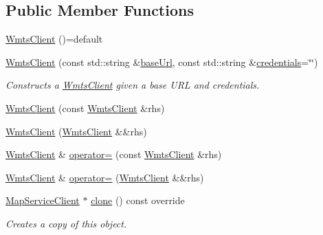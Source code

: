\subsection*{Public Member Functions}
\begin{DoxyCompactItemize}
\item 
\hyperlink{classdg_1_1deepcore_1_1imagery_1_1_wmts_client_a408ab2e9f51053db6d0fbf1074567851}{Wmts\+Client} ()=default
\item 
\hyperlink{classdg_1_1deepcore_1_1imagery_1_1_wmts_client_a7795f68322e43cc9485d541f70caea1c}{Wmts\+Client} (const std\+::string \&\hyperlink{group___imagery_module_gadf279770cec6dc9ac56348bb2e1b29e1}{base\+Url}, const std\+::string \&\hyperlink{group___imagery_module_gac4c03ea635c336ca2fe7de533706c11c}{credentials}=\char`\"{}\char`\"{})
\begin{DoxyCompactList}\small\item\em Constructs a \hyperlink{classdg_1_1deepcore_1_1imagery_1_1_wmts_client}{Wmts\+Client} given a base U\+RL and credentials. \end{DoxyCompactList}\item 
\hyperlink{classdg_1_1deepcore_1_1imagery_1_1_wmts_client_a364b883e40e217fb5f4653d53de21e59}{Wmts\+Client} (const \hyperlink{classdg_1_1deepcore_1_1imagery_1_1_wmts_client}{Wmts\+Client} \&rhs)
\item 
\hyperlink{classdg_1_1deepcore_1_1imagery_1_1_wmts_client_ab4f05e3d9d3bce118d5f74d0570215dc}{Wmts\+Client} (\hyperlink{classdg_1_1deepcore_1_1imagery_1_1_wmts_client}{Wmts\+Client} \&\&rhs)
\item 
\hyperlink{classdg_1_1deepcore_1_1imagery_1_1_wmts_client}{Wmts\+Client} \& \hyperlink{classdg_1_1deepcore_1_1imagery_1_1_wmts_client_a9306a2e8c09ab015a1336a0177e81025}{operator=} (const \hyperlink{classdg_1_1deepcore_1_1imagery_1_1_wmts_client}{Wmts\+Client} \&rhs)
\item 
\hyperlink{classdg_1_1deepcore_1_1imagery_1_1_wmts_client}{Wmts\+Client} \& \hyperlink{classdg_1_1deepcore_1_1imagery_1_1_wmts_client_a0bee1f9ef12b706228f12bf34bf62f74}{operator=} (\hyperlink{classdg_1_1deepcore_1_1imagery_1_1_wmts_client}{Wmts\+Client} \&\&rhs)
\item 
\hyperlink{classdg_1_1deepcore_1_1imagery_1_1_map_service_client}{Map\+Service\+Client} $\ast$ \hyperlink{classdg_1_1deepcore_1_1imagery_1_1_wmts_client_a2719956d896a32d0172a8cdeda0928e6}{clone} () const override
\begin{DoxyCompactList}\small\item\em Creates a copy of this object. \end{DoxyCompactList}\item 

\end{DoxyCompactItemize}
